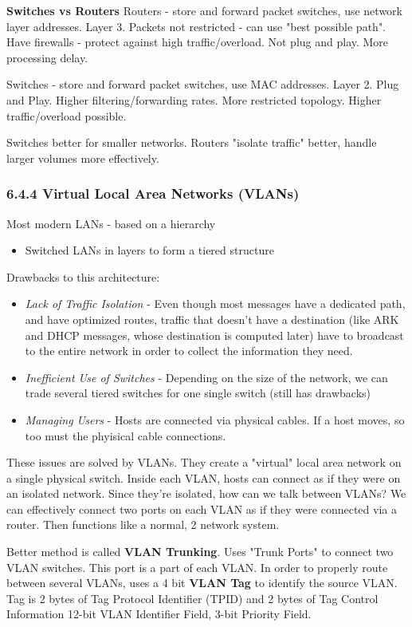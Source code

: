 \documentclass[11pt]{article}
\begin{document}
\textbf{Switches vs Routers}
Routers - store and forward packet switches, use network layer addresses. Layer 3. Packets not restricted - can use "best possible path". Have firewalls - protect against high traffic/overload. Not plug and play. More processing delay. 


Switches - store and forward packet switches, use MAC addresses. Layer 2. Plug and Play. Higher filtering/forwarding rates. More restricted topology. Higher traffic/overload possible.

Switches better for smaller networks. Routers "isolate traffic" better, handle larger volumes more effectively. 

\subsubsection{6.4.4 Virtual Local Area Networks (VLANs)}
\label{sec:org8e93333}
Most modern LANs - based on a hierarchy
\begin{itemize}
\item Switched LANs in layers to form a tiered structure
\end{itemize}


Drawbacks to this architecture:
\begin{itemize}
\item \emph{Lack of Traffic Isolation} - Even though most messages have a dedicated path, and have optimized routes, traffic that doesn't have a destination (like ARK and DHCP messages, whose destination is computed later) have to broadcast to the entire network in order to collect the information they need.
\item \emph{Inefficient Use of Switches} - Depending on the size of the network, we can trade several tiered switches for one single switch (still has drawbacks)
\item \emph{Managing Users} - Hosts are connected via physical cables. If a host moves, so too must the phyisical cable connections.
\end{itemize}


These issues are solved by VLANs.
They create a "virtual" local area network on a single physical switch. Inside each VLAN, hosts can connect as if they were on an isolated network.
Since they're isolated, how can we talk between VLANs?
We can effectively connect two ports on each VLAN as if they were connected via a router. Then functions like a normal, 2 network system.

Better method is called \textbf{VLAN Trunking}.
Uses "Trunk Ports" to connect two VLAN switches. This port is a part of each VLAN. In order to properly route between several VLANs, uses a 4 bit \textbf{VLAN Tag} to identify the source VLAN.
Tag is 2 bytes of Tag Protocol Identifier (TPID) and 2 bytes of Tag Control Information
12-bit VLAN Identifier Field, 3-bit Priority Field. 
\end{document}
